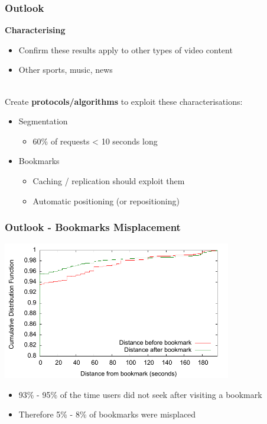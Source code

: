 \documentclass[xcolor=pdftex,dvipsnames,table]{beamer}
\begin{document}
\begin{frame}
    \frametitle{Outlook}

    \textbf{Characterising}
    \begin{itemize}
        \item Confirm these results apply to other types of video content
        \item Other sports, music, news
    \end{itemize}~\\

    Create \textbf{protocols/algorithms} to exploit these characterisations:
    \begin{itemize}
        \item Segmentation
        \begin{itemize}
            \item 60\% of requests < 10 seconds long
        \end{itemize}

        \item Bookmarks
        \begin{itemize}
            \item Caching / replication should exploit them
            \item Automatic positioning (or repositioning)
        \end{itemize}

    \end{itemize}
\end{frame}

\begin{frame}
    \frametitle{Outlook - Bookmarks Misplacement}

    \includegraphics[width=10cm]{all_backs_cdf-20}

    {\footnotesize
    \begin{itemize}
        \item {93\% - 95\% of the time users did not seek after visiting a bookmark}
        \item {Therefore 5\% - 8\% of bookmarks were misplaced}
    \end{itemize}
    }

\end{frame}
\end{document}

